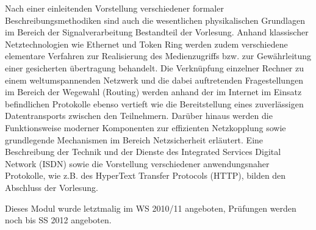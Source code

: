 \begin{module}
\begin{content}
Nach einer einleitenden Vorstellung verschiedener formaler Beschreibungsmethodiken sind auch die wesentlichen physikalischen Grundlagen im Bereich der Signalverarbeitung Bestandteil der Vorlesung. Anhand klassischer Netztechnologien wie Ethernet und Token Ring werden zudem verschiedene elementare Verfahren zur Realisierung des Medienzugriffs bzw. zur Gewährleitung einer gesicherten übertragung behandelt. Die Verknüpfung einzelner Rechner zu einem weltumspannenden Netzwerk und die dabei auftretenden Fragestellungen im Bereich der Wegewahl (Routing) werden anhand der im Internet im Einsatz befindlichen Protokolle ebenso vertieft wie die Bereitstellung eines zuverlässigen Datentransports zwischen den Teilnehmern. Darüber hinaus werden die Funktionsweise moderner Komponenten zur effizienten Netzkopplung sowie grundlegende Mechanismen im Bereich Netzsicherheit erläutert. Eine Beschreibung der Technik und der Dienste des Integrated Services Digital Network (ISDN) sowie die Vorstellung verschiedener anwendungsnaher Protokolle, wie z.B. des HyperText Transfer Protocols (HTTP), bilden den Abschluss der Vorlesung.


\end{content}

\begin{remarks}Dieses Modul wurde letztmalig im WS 2010/11 angeboten, Prüfungen werden noch bis SS 2012 angeboten.

\end{remarks}

\end{module}

